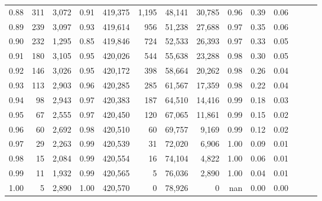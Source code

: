 \begin{tabular}{rrrrrrrrrrrrrr}
0.88 &     311 &  3,072 &  0.91 &  419,375 &    1,195 &  48,141 &  30,785 &  0.96 &  0.39 &      0.06 \\
0.89 &     239 &  3,097 &  0.93 &  419,614 &      956 &  51,238 &  27,688 &  0.97 &  0.35 &      0.06 \\
0.90 &     232 &  1,295 &  0.85 &  419,846 &      724 &  52,533 &  26,393 &  0.97 &  0.33 &      0.05 \\
0.91 &     180 &  3,105 &  0.95 &  420,026 &      544 &  55,638 &  23,288 &  0.98 &  0.30 &      0.05 \\
0.92 &     146 &  3,026 &  0.95 &  420,172 &      398 &  58,664 &  20,262 &  0.98 &  0.26 &      0.04 \\
0.93 &     113 &  2,903 &  0.96 &  420,285 &      285 &  61,567 &  17,359 &  0.98 &  0.22 &      0.04 \\
0.94 &      98 &  2,943 &  0.97 &  420,383 &      187 &  64,510 &  14,416 &  0.99 &  0.18 &      0.03 \\
0.95 &      67 &  2,555 &  0.97 &  420,450 &      120 &  67,065 &  11,861 &  0.99 &  0.15 &      0.02 \\
0.96 &      60 &  2,692 &  0.98 &  420,510 &       60 &  69,757 &   9,169 &  0.99 &  0.12 &      0.02 \\
0.97 &      29 &  2,263 &  0.99 &  420,539 &       31 &  72,020 &   6,906 &  1.00 &  0.09 &      0.01 \\
0.98 &      15 &  2,084 &  0.99 &  420,554 &       16 &  74,104 &   4,822 &  1.00 &  0.06 &      0.01 \\
0.99 &      11 &  1,932 &  0.99 &  420,565 &        5 &  76,036 &   2,890 &  1.00 &  0.04 &      0.01 \\
1.00 &       5 &  2,890 &  1.00 &  420,570 &        0 &  78,926 &       0 &   nan &  0.00 &      0.00 \\
\bottomrule
\end{tabular}

